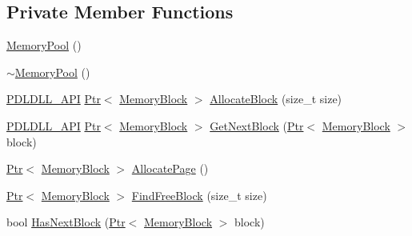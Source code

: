 \subsection*{Private Member Functions}
\begin{DoxyCompactItemize}
\item 
\mbox{\hyperlink{classpdl_1_1memory_1_1_memory_pool_ae18fdcc408eed42d1cadd8e402ae39ff}{Memory\+Pool}} ()
\item 
\mbox{\hyperlink{classpdl_1_1memory_1_1_memory_pool_a480d892e96304f8ae65d3bbb87c1d568}{$\sim$\+Memory\+Pool}} ()
\item 
\mbox{\hyperlink{_p_d_core_8h_ae8c5186e53170509c65eaabab6c2c705}{P\+D\+L\+D\+L\+L\+\_\+\+A\+PI}} \mbox{\hyperlink{classpdl_1_1memory_1_1_ptr}{Ptr}}$<$ \mbox{\hyperlink{classpdl_1_1memory_1_1_memory_pool_ae6b2ec19cb71cae4fa60b7d342a1743b}{Memory\+Block}} $>$ \mbox{\hyperlink{classpdl_1_1memory_1_1_memory_pool_a67dcb24b341e21105167b5d4c9476193}{Allocate\+Block}} (size\+\_\+t size)
\item 
\mbox{\hyperlink{_p_d_core_8h_ae8c5186e53170509c65eaabab6c2c705}{P\+D\+L\+D\+L\+L\+\_\+\+A\+PI}} \mbox{\hyperlink{classpdl_1_1memory_1_1_ptr}{Ptr}}$<$ \mbox{\hyperlink{classpdl_1_1memory_1_1_memory_pool_ae6b2ec19cb71cae4fa60b7d342a1743b}{Memory\+Block}} $>$ \mbox{\hyperlink{classpdl_1_1memory_1_1_memory_pool_a9125f620065a5e400081a300b8d4739b}{Get\+Next\+Block}} (\mbox{\hyperlink{classpdl_1_1memory_1_1_ptr}{Ptr}}$<$ \mbox{\hyperlink{classpdl_1_1memory_1_1_memory_pool_ae6b2ec19cb71cae4fa60b7d342a1743b}{Memory\+Block}} $>$ block)
\item 
\mbox{\hyperlink{classpdl_1_1memory_1_1_ptr}{Ptr}}$<$ \mbox{\hyperlink{classpdl_1_1memory_1_1_memory_pool_ae6b2ec19cb71cae4fa60b7d342a1743b}{Memory\+Block}} $>$ \mbox{\hyperlink{classpdl_1_1memory_1_1_memory_pool_a9fc73dcbf3b534dc08fa82f772a4d40a}{Allocate\+Page}} ()
\item 
\mbox{\hyperlink{classpdl_1_1memory_1_1_ptr}{Ptr}}$<$ \mbox{\hyperlink{classpdl_1_1memory_1_1_memory_pool_ae6b2ec19cb71cae4fa60b7d342a1743b}{Memory\+Block}} $>$ \mbox{\hyperlink{classpdl_1_1memory_1_1_memory_pool_a8d41c5d42d8b8b2c7aaeecf659e0a173}{Find\+Free\+Block}} (size\+\_\+t size)
\item 
bool \mbox{\hyperlink{classpdl_1_1memory_1_1_memory_pool_a73db254e334ff1d63a7866f6cd0b9de4}{Has\+Next\+Block}} (\mbox{\hyperlink{classpdl_1_1memory_1_1_ptr}{Ptr}}$<$ \mbox{\hyperlink{classpdl_1_1memory_1_1_memory_pool_ae6b2ec19cb71cae4fa60b7d342a1743b}{Memory\+Block}} $>$ block)
\end{DoxyCompactItemize}
